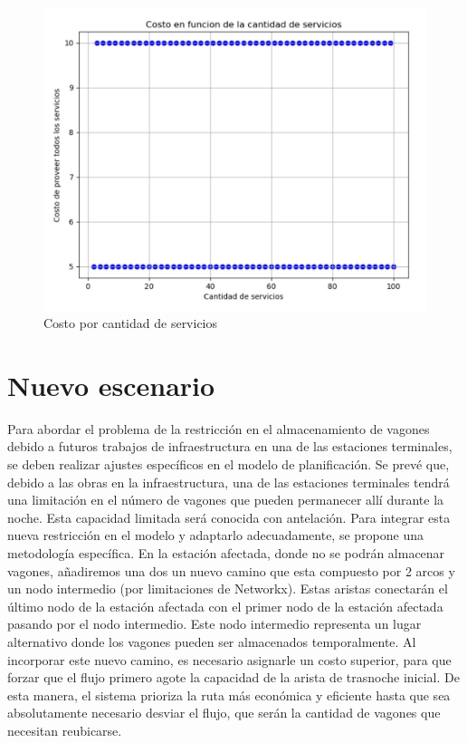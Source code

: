 \documentclass{article}
\begin{document}
\begin{figure}[h!]
    \raggedright
    \centering

    \includegraphics[scale=0.35]{costoXServicios.jpeg}
    \caption{Costo por cantidad de servicios}

    \label{fig:ejemplo}
\end{figure}

\section{Nuevo escenario}
    Para abordar el problema de la restricción en el almacenamiento de vagones debido a futuros trabajos de infraestructura en una de las estaciones terminales, se deben realizar ajustes específicos en el modelo de planificación.
    Se prevé que, debido a las obras en la infraestructura, una de las estaciones terminales tendrá una limitación en el número de vagones que pueden permanecer allí durante la noche. Esta capacidad limitada será conocida con antelación. Para integrar esta nueva restricción en el modelo y adaptarlo adecuadamente, se propone una metodología específica.
    En la estación afectada, donde no se podrán almacenar vagones, añadiremos una dos un nuevo camino que esta compuesto por 2 arcos y un nodo intermedio (por limitaciones de Networkx). Estas aristas conectarán el último nodo de la estación afectada con el primer nodo de la estación afectada pasando por el nodo intermedio. Este nodo intermedio representa un lugar alternativo donde los vagones pueden ser almacenados temporalmente.
    Al incorporar este nuevo camino, es necesario asignarle un costo superior, para que forzar que el flujo primero agote la capacidad de la arista de trasnoche inicial. De esta manera, el sistema prioriza la ruta más económica y eficiente hasta que sea absolutamente necesario desviar el flujo, que serán la cantidad de vagones que necesitan reubicarse.
    
\end{document}
